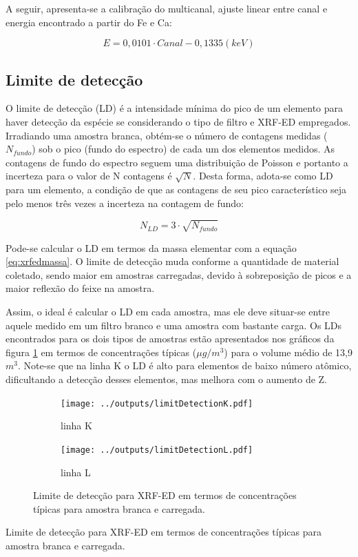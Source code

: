 A seguir, apresenta-se a calibração do multicanal, ajuste linear entre canal 
e energia encontrado a partir do Fe e Ca:

\begin{equation}
  E = 0,0101 \cdot Canal - 0,1335 (keV)
\end{equation}

\subsection{Limite de detecção}

O limite de detecção (LD) é a intensidade mínima do pico de um elemento para haver 
detecção da espécie se considerando o tipo de filtro e XRF-ED empregados. 
Irradiando uma amostra branca, obtém-se o número de contagens 
medidas ($N_{fundo}$) sob o pico (fundo do espectro) de cada um dos elementos
medidos.
As contagens de fundo do espectro seguem uma distribuição de Poisson e portanto 
a incerteza para o valor de N contagens é $\sqrt{N}$.
Desta forma, adota-se como LD para um elemento, a condição de que as contagens de seu pico 
característico seja pelo menos três vezes a incerteza na contagem de fundo:

\begin{equation}
  \label{eq:limitedeteccao}
  N_{LD} = 3 \cdot \sqrt{N_{fundo}}
\end{equation}

Pode-se calcular o LD em termos da massa elementar com a 
equação \ref{eq:xrfedmassa}. O limite de detecção muda conforme a quantidade de 
material coletado, sendo maior em amostras carregadas, devido à sobreposição de 
picos e a maior reflexão do feixe na amostra.

Assim, o ideal é calcular o LD em cada amostra, mas ele deve situar-se entre 
aquele medido em um filtro branco e uma amostra com bastante carga.
Os LDs encontrados para os dois tipos de amostras estão apresentados 
nos gráficos da figura \ref{table:ld} em termos de concentrações típicas 
($\mu g / m^3$) para o volume médio de 13,9 $m^3$. 
Note-se que na linha K o LD é alto para elementos de baixo número atômico, 
dificultando a detecção desses elementos, mas melhora com o aumento de Z. 

\begin{figure}[H]
  \begin{subfigure}[b]{0.5\textwidth}
    \texttt{[image: ../outputs/limitDetectionK.pdf]}
    \caption{linha K}
  \end{subfigure}%
  \begin{subfigure}[b]{0.5\textwidth}
    \texttt{[image: ../outputs/limitDetectionL.pdf]}
    \caption{linha L}
  \end{subfigure}
  \caption{Limite de detecção para XRF-ED em termos de concentrações típicas 
           para amostra branca e carregada.
           \label{table:ld}}
\end{figure}

\newpage
\begin{table}[H]
  \centering
  
  \caption{Limite de detecção para XRF-ED em termos de concentrações típicas 
           para amostra branca e carregada. \label{table:LD}}
\end{table}
